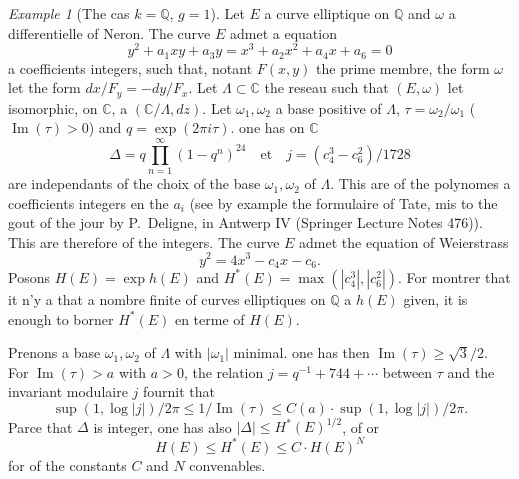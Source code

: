 \documentclass[12pt,a4paper]{article}
\theoremstyle{plain}
\theoremstyle{definition}
\theoremstyle{remark}
\newtheorem{example}[theorem]{Example}
\DeclareMathOperator{\Impartie}{Im}
\DeclareMathOperator{\Sup}{sup}
\newcommand{\CC}{\mathbb{C}}
\newcommand{\QQ}{\mathbb{Q}}
\providecommand{\CC}{\mathbb{C}}
\providecommand{\QQ}{\mathbb{Q}}
\begin{document}
\begin{example}[The cas $k = \QQ$, $g = 1$]
Let $E$ a curve elliptique on $\QQ$ and $\omega$ a differentielle of Neron. The curve $E$ admet a equation
\[
y^2 + a_1xy + a_3y = x^3 + a_2x^2 + a_4x + a_6 = 0
\]
a coefficients integers, such that, notant $F(x,y)$ the prime membre, the form $\omega$ let the form $dx/F_y = -dy/F_x$. Let $\Lambda \subset \CC$ the reseau such that $(E,\omega)$ let isomorphic, on $\CC$, a $(\CC/\Lambda, dz)$. Let $\omega_1, \omega_2$ a base positive of $\Lambda$, $\tau = \omega_2/\omega_1$ ($\Impartie(\tau) > 0$) and $q = \exp(2\pi i \tau)$. one has on $\CC$
\[
\Delta = q \prod_{n=1}^{\infty}(1-q^n)^{24} \quad \text{et} \quad j = (c_4^3 - c_6^2)/1728
\]
 are independants of the choix of the base $\omega_1, \omega_2$ of $\Lambda$. This are of the polynomes a coefficients integers en the $a_i$ (see by example the formulaire of Tate, mis to the gout of the jour by P.~Deligne, in Antwerp IV (Springer Lecture Notes 476)). This are therefore of the integers. The curve $E$ admet the equation of Weierstrass
\[
y^2 = 4x^3 - c_4x - c_6.
\]
Posons $H(E) = \exp h(E)$ and $H^*(E) = \max(|c_4^3|, |c_6^2|)$. For montrer that it n'y a that a nombre finite of curves elliptiques on $\QQ$ a $h(E)$ given, it is enough to borner $H^*(E)$ en terme of $H(E)$.

Prenons a base $\omega_1, \omega_2$ of $\Lambda$ with $|\omega_1|$ minimal. one has then $\Impartie(\tau) \geq \sqrt{3}/2$. For $\Impartie(\tau) > a$ with $a > 0$, the relation $j = q^{-1} + 744 + \cdots$ between $\tau$ and the invariant modulaire $j$ fournit that
\[
\Sup(1, \log |j|) / 2\pi \leq 1/\Impartie(\tau) \leq C(a) \cdot \Sup(1, \log |j|) / 2\pi.
\]
Parce that $\Delta$ is integer, one has also $|\Delta| \leq H^*(E)^{1/2}$, of or
\[
H(E) \leq H^*(E) \leq C \cdot H(E)^N
\]
for of the constants $C$ and $N$ convenables.
\end{example}
\end{document}
